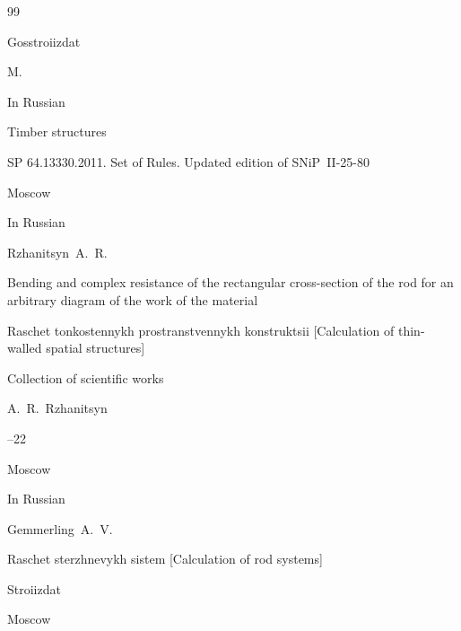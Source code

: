 \begin{thebibliography}{99}

\publ Gosstroiizdat

\publaddr M.









\lang In Russian

\book  Timber structures

\bookinfo SP 64.13330.2011. Set of Rules. Updated edition of SNiP~II-25-80


\publaddr Moscow











\lang In Russian

\by Rzhanitsyn~A.~R.

\paper Bending and complex resistance of the rectangular cross-section of the rod for an arbitrary diagram of the work of the material

\inbook Raschet tonkostennykh prostranstvennykh konstruktsii \rm [Calculation of thin-walled spatial structures]

\bookinfo Collection of scien\-tific works

\ed A.~R.~Rzhanitsyn


--22

\publaddr Moscow












\lang In Russian

\by Gemmerling~A.~V.

\book Raschet sterzhnevykh sistem \rm [Calculation of rod systems]


\publ Stroiizdat

\publaddr Moscow







\end{thebibliography}
